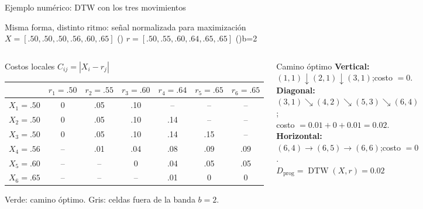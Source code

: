 \documentclass[aspectratio=169,11pt]{beamer}
\begin{document}
\begin{frame}{Ejemplo numérico: DTW con los tres movimientos}
  \tiny
  \begin{block}{Misma forma, distinto ritmo: señal normalizada para maximización}
    \centering
    $X=[.50,.50,.50,.56,.60,.65]$ \;()\qquad
    $r=[.50,.55,.60,.64,.65,.65]$ \;()\qquad b=2
  \end{block}

  \begin{columns}[T,onlytextwidth]
      \begin{exampleblock}{Costos locales $C_{ij}=|X_i-r_j|$}
        \centering
        {\setlength{\tabcolsep}{1.8pt}\renewcommand{\arraystretch}{1.10}
        \begin{tabular}{c|cccccc}
          & $r_1=.50$ & $r_2=.55$ & $r_3=.60$ & $r_4=.64$ & $r_5=.65$ & $r_6=.65$\\ \hline
          $X_1=.50$ & \cellcolor{best!22}0 & .05 & .10 & \cellcolor{gray!10}-- & \cellcolor{gray!10}-- & \cellcolor{gray!10}--\\
          $X_2=.50$ & \cellcolor{best!22}0 & .05 & .10 & .14 & \cellcolor{gray!10}-- & \cellcolor{gray!10}--\\
          $X_3=.50$ & \cellcolor{best!22}0 & .05 & .10 & .14 & .15 & \cellcolor{gray!10}--\\
          $X_4=.56$ & \cellcolor{gray!10}-- & \cellcolor{best!22}.01 & .04 & .08 & .09 & .09\\
          $X_5=.60$ & \cellcolor{gray!10}-- & \cellcolor{gray!10}-- & \cellcolor{best!22}0 & .04 & .05 & .05\\
          $X_6=.65$ & \cellcolor{gray!10}-- & \cellcolor{gray!10}-- & \cellcolor{gray!10}-- & \cellcolor{best!22}.01 & \cellcolor{best!22}0 & \cellcolor{best!22}0
        \end{tabular}}

        {\scriptsize Verde: camino óptimo. Gris: celdas fuera de la banda $b=2$.}
      \end{exampleblock}

      \begin{exampleblock}{Camino óptimo}
        \tiny
        \textbf{Vertical:}
        $(1,1)\downarrow(2,1)\downarrow(3,1)$;\quad costo $=0$.\\[3pt]
        \textbf{Diagonal:}
        $(3,1)\searrow(4,2)\searrow(5,3)\searrow(6,4)$;\\[-1pt]
        \hfill costo $=0.01+0+0.01=0.02$.\\[3pt]
        \textbf{Horizontal:}
        $(6,4)\rightarrow(6,5)\rightarrow(6,6)$;\quad costo $=0$.\\[5pt]
        \centering
        $\boxed{D_{\mathrm{prog}}=\operatorname{DTW}(X,r)=0.02}$
      \end{exampleblock}
  \end{columns}


\end{frame}
\end{document}
